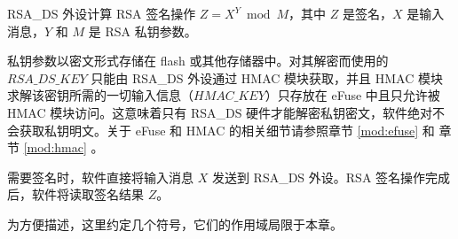 \documentclass[main\_\_CN.tex]{subfiles}
\begin{document}
RSA\_DS 外设计算 RSA 签名操作 \begin{math}Z = X^{Y} \bmod M\end{math}，其中 \begin{math}Z\end{math} 是签名，\begin{math}X\end{math} 是输入消息，\begin{math}Y\end{math} 和 \begin{math}M\end{math} 是 RSA 私钥参数。

私钥参数以密文形式存储在 flash 或其他存储器中。对其解密而使用的 \begin{math} RSA\_DS\_KEY \end{math} 只能由 RSA\_DS 外设通过 HMAC 模块获取，并且 HMAC 模块求解该密钥所需的一切输入信息（\begin{math} HMAC\_KEY \end{math}）只存放在 eFuse 中且只允许被 HMAC 模块访问。这意味着只有 RSA\_DS 硬件才能解密私钥密文，软件绝对不会获取私钥明文。关于 eFuse 和 HMAC 的相关细节请参照章节 \ref{mod:efuse} \textit{} 和 章节 \ref{mod:hmac} \textit{}。

需要签名时，软件直接将输入消息 \begin{math}X\end{math} 发送到 RSA\_DS 外设。RSA 签名操作完成后，软件将读取签名结果 \begin{math}Z\end{math}。


为方便描述，这里约定几个符号，它们的作用域局限于本章。
\end{document}
